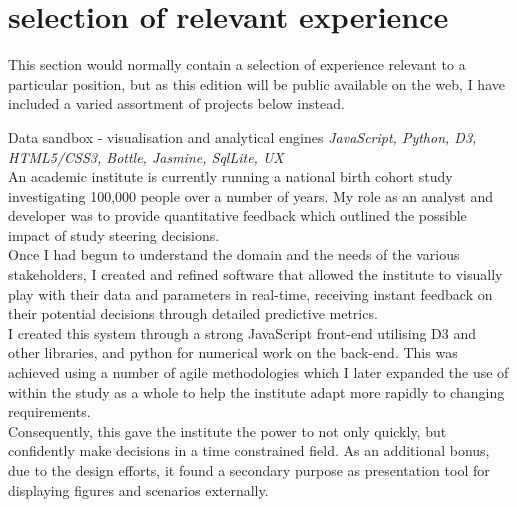 \documentclass[]{friggeri-cv} %
\begin{document}

\newpage
\section{selection of relevant experience}
This section would normally contain a selection of experience relevant to a particular position, but as this edition will be public available on the web, I have included a varied assortment of projects below instead. 

\begin{projectentrylist}
\projectentry
{Data sandbox -  visualisation and analytical engines}
{\emph{JavaScript, Python, D3, HTML5/CSS3, Bottle, Jasmine, SqlLite, UX} \\
An academic institute is currently running a national birth cohort study investigating 100,000 people over a number of years. My role as an analyst and developer was to provide quantitative feedback which outlined the possible impact of study steering decisions. \\
Once I had begun to understand the domain and the needs of the various stakeholders, I created and refined software that allowed the institute to visually play with their data and parameters in real-time, receiving instant feedback on their potential decisions through detailed predictive metrics.\\
I created this system through a strong JavaScript front-end utilising D3 and other libraries, and python for numerical work on the back-end. This was achieved using a number of agile methodologies which I later expanded the use of within the study as a whole to help the institute adapt more rapidly to changing requirements. \\
Consequently, this gave the institute the power to not only quickly, but confidently make decisions in a time constrained field. As an additional bonus, due to the design efforts, it found a secondary purpose as presentation tool for displaying figures and scenarios externally.}


\end{projectentrylist}
\end{document}
